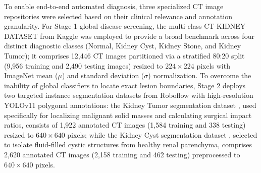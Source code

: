 \documentclass[]{elsarticle}
\begin{document}
To enable end-to-end automated diagnosis, three specialized CT image repositories were selected based on their clinical relevance and annotation granularity. For Stage 1 global disease screening, the multi-class CT-KIDNEY-DATASET from Kaggle \cite{dataset_kaggle} was employed to provide a broad benchmark across four distinct diagnostic classes (Normal, Kidney Cyst, Kidney Stone, and Kidney Tumor); it comprises 12,446 CT images partitioned via a stratified 80:20 split (9,956 training and 2,490 testing images) resized to $224 \times 224$ pixels with ImageNet mean ($\mu$) and standard deviation ($\sigma$) normalization. To overcome the inability of global classifiers to locate exact lesion boundaries, Stage 2 deploys two targeted instance segmentation datasets from Roboflow with high-resolution YOLOv11 polygonal annotations: the Kidney Tumor segmentation dataset \cite{dataset_roboflow_tumor}, used specifically for localizing malignant solid masses and calculating surgical impact ratios, consists of 1,922 annotated CT images (1,584 training and 338 testing) resized to $640 \times 640$ pixels; while the Kidney Cyst segmentation dataset \cite{dataset_roboflow_cyst}, selected to isolate fluid-filled cystic structures from healthy renal parenchyma, comprises 2,620 annotated CT images (2,158 training and 462 testing) preprocessed to $640 \times 640$ pixels.
\end{document}
